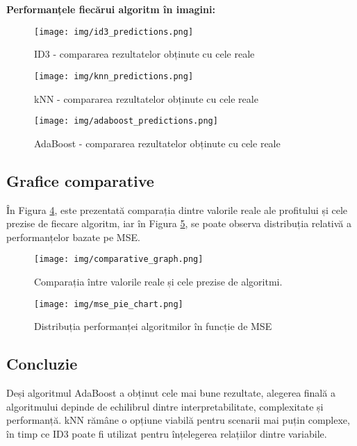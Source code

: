 \documentclass{article}
\begin{document}
\textbf{Performanțele fiecărui algoritm în imagini:}

\begin{figure}[H]
\centering
\texttt{[image: img/id3\_predictions.png]}
\caption{ID3 - compararea rezultatelor obținute cu cele reale}
\label{fig:scatter}
\end{figure}

\begin{figure}[H]
\centering
\texttt{[image: img/knn\_predictions.png]}
\caption{kNN - compararea rezultatelor obținute cu cele reale}
\label{fig:scatter}
\end{figure}

\begin{figure}[H]
\centering
\texttt{[image: img/adaboost\_predictions.png]}
\caption{AdaBoost - compararea rezultatelor obținute cu cele reale}
\label{fig:scatter}
\end{figure}

\subsection*{Grafice comparative}
În Figura \ref{fig:scatter}, este prezentată comparația dintre valorile reale ale profitului și cele prezise de fiecare algoritm, iar în Figura \ref{fig:pie}, se poate observa distribuția relativă a performanțelor bazate pe MSE.

\begin{figure}[H]
\centering
\texttt{[image: img/comparative\_graph.png]}
\caption{Comparația între valorile reale și cele prezise de algoritmi.}
\label{fig:scatter}
\end{figure}

\begin{figure}[H]
\centering
\texttt{[image: img/mse\_pie\_chart.png]}
\caption{Distribuția performanței algoritmilor în funcție de MSE}
\label{fig:pie}
\end{figure}

\subsection*{Concluzie}
Deși algoritmul AdaBoost a obținut cele mai bune rezultate, alegerea finală a algoritmului depinde de echilibrul dintre interpretabilitate, complexitate și performanță. kNN rămâne o opțiune viabilă pentru scenarii mai puțin complexe, în timp ce ID3 poate fi utilizat pentru înțelegerea relațiilor dintre variabile.
\end{document}
